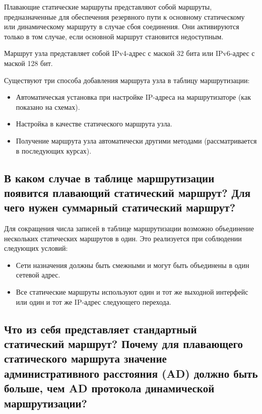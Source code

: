 Плавающие статические маршруты представляют собой маршруты,
предназначенные для обеспечения резервного пути к основному статическому
или динамическому маршруту в случае сбоя соединения.
Они активируются только в том случае,
если основной маршрут становится недоступным.\par
Маршрут узла представляет собой IPv4-адрес с маской 32 бита
или IPv6-адрес с маской 128 бит.\par
Существуют три способа добавления маршрута узла в таблицу маршрутизации:

\begin{itemize}
    \item Автоматическая установка при настройке IP-адреса
    на маршрутизаторе (как показано на схемах).
    \item Настройка в качестве статического маршрута узла.
    \item Получение маршрута узла автоматически другими методами
    (рассматривается в последующих курсах).
\end{itemize}

\subsection{В каком случае в таблице маршрутизации появится
плавающий статический маршрут?
Для чего нужен суммарный статический маршрут?}

Для сокращения числа записей в таблице маршрутизации возможно
объединение нескольких статических маршрутов в один.
Это реализуется при соблюдении следующих условий:

\begin{itemize}
    \item Сети назначения должны быть смежными и могут быть объединены
    в один сетевой адрес.
    \item Все статические маршруты используют один
    и тот же выходной интерфейс или один
    и тот же IP-адрес следующего перехода.
\end{itemize}

\subsection{Что из себя представляет стандартный статический маршрут?
Почему для плавающего статического маршрута значение
административного расстояния (AD) должно быть больше,
    чем AD протокола динамической маршрутизации?}

